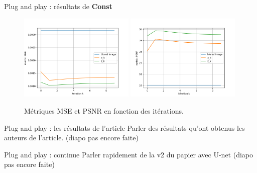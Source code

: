 \documentclass[11pt]{beamer}
\begin{document}
\begin{frame}{Plug and play : résultats de \textbf{Const}}
    \begin{figure}[b]
        \centering
        \includegraphics[width=0.49\textwidth]{../images/hqs_constant/MSE.png}
        \includegraphics[width=0.49\textwidth]{../images/hqs_constant/PSNR.png}
        \caption{Métriques MSE et PSNR en fonction des itérations.}
    \end{figure}
\end{frame}

\begin{frame}{Plug and play : les résultats de l'article}
    Parler des résultats qu'ont obtenus les auteurs de l'article. (diapo pas encore faite)
\end{frame}

\begin{frame}{Plug and play : continue}
    Parler rapidement de la v2 du papier avec U-net (diapo pas encore faite)
\end{frame}
\end{document}
